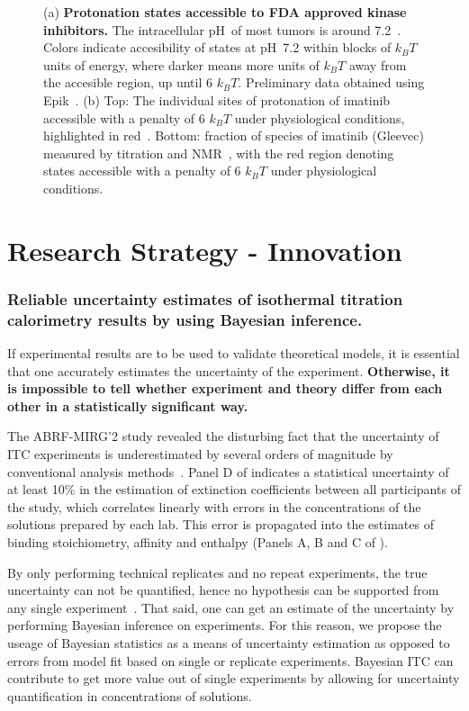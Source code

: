 \documentclass[10pt,final]{article}
\newif\ifinstr
\newcommand{\instr}[1]{\ifdraft{\ifinstr {\color{cyan}\emph{#1}} \fi}{}}
\newcommand{\pH}{p$\mathrm{H}$\ }
\begin{document}
\begin{figure}[H]
\begin{subfigure}{.48\textwidth}
  \caption{}
  \label{figure:imatinib-pKa}
\end{subfigure}
\caption{(a) \textbf{Protonation states accessible to FDA approved kinase inhibitors.} 
The intracellular \pH of most tumors is around 7.2~\autocite{Griffiths1991a,Stubbs2000a}.
Colors indicate accesibility of states at \pH 7.2 within blocks of $k_BT$ units of energy, where darker means more units of $k_BT$ away from the accesible region, up until 6 $k_BT$.
Preliminary data obtained using Epik~\autocite{Shelley2007a,Greenwood2010a}.
(b) Top: The individual sites of protonation of imatinib accessible with a penalty of 6 $k_BT$ under physiological conditions, highlighted in red~\autocite{Szakacs2005a}. Bottom: fraction of species of imatinib (Gleevec) measured by titration and NMR~\autocite{Szakacs2005a}, with the red region denoting states accessible with a penalty of 6 $k_BT$ under physiological conditions.}
\label{figure:kinase-pKa}
\end{figure}


\section*{Research Strategy - Innovation}
\instr{Explain how your proposal differs from what others have tried.}
\subsubsection*{Reliable uncertainty estimates of isothermal titration calorimetry results by using Bayesian inference.}
If experimental results are to be used to validate theoretical models, it is essential that one accurately estimates the uncertainty of the experiment. 
%
\textbf{Otherwise, it is impossible to tell whether experiment and theory differ from each other in a statistically significant way.}

The ABRF-MIRG'2 study revealed the disturbing fact that the uncertainty of ITC experiments is underestimated by several orders of magnitude by conventional analysis methods~\autocite{Myszka2003a}.
%
Panel D of  indicates a statistical uncertainty of at least 10\% in the estimation of extinction coefficients between all participants of the study, which correlates linearly with errors in the concentrations of the solutions prepared by each lab. 
%
This error is propagated into the estimates of binding stoichiometry, affinity and enthalpy  (Panels A, B and C of ).

By only performing technical replicates  and no repeat experiments, the true uncertainty can not be quantified, hence no hypothesis can be supported from any single experiment~\autocite{Vaux2012a}.
%
That said, one can get an estimate of the uncertainty by performing Bayesian inference on experiments.
%
For this reason, we propose the useage of Bayesian statistics as a means of uncertainty estimation as opposed to errors from model fit based on single or replicate experiments.
%
Bayesian ITC can contribute to get more value out of single experiments by allowing for uncertainty quantification in concentrations of solutions. 
\end{document}
